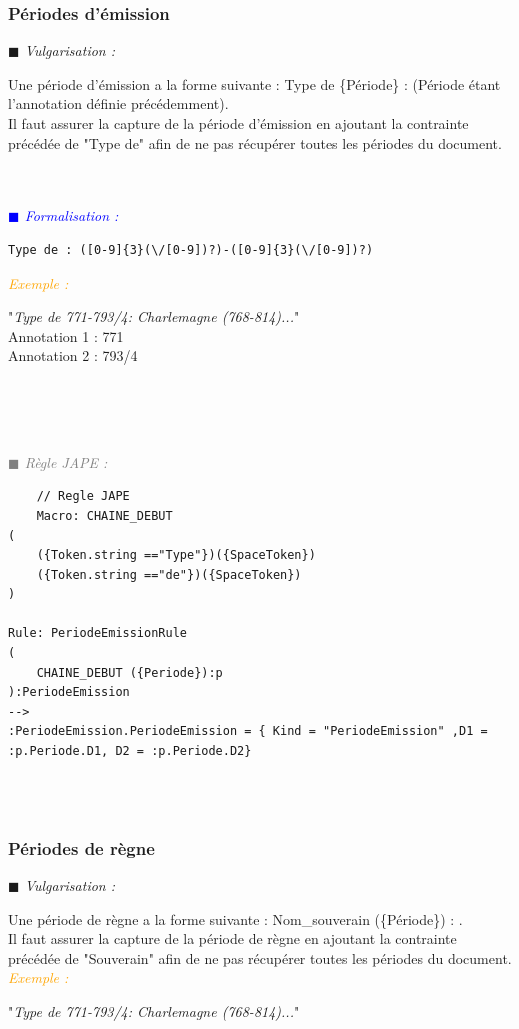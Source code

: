 \documentclass[a4paper, 11pt]{report}
\newenvironment{vulgarisation}
    {
    \textit{\textcolor{dark-blue}{$\blacksquare$  Vulgarisation : \\}}

    }
    {
    ~\\~\\
    }
\newenvironment{formalisation}
    {
    \textit{\textcolor{blue}{$\blacksquare$  Formalisation : \\}}
    }
    {
    ~\\~\\
    }
\newenvironment{codage}
    {
    \textit{\textcolor{gray}{$\blacksquare$  Règle JAPE : \\}}
    }
    {
    ~\\~\\
    }
\newenvironment{exemple}
    {
    \textit{\textcolor{orange}{
    Exemple : \\}}
    }
    {
    ~\\
    }
\begin{document}
\newpage
\subsubsection{Périodes d'émission}
\begin{vulgarisation}
    Une période d'émission a la forme suivante :  \og Type de \{Période\} : \fg{} (Période étant l'annotation définie précédemment).\\
    Il faut assurer la capture de la période d'émission en ajoutant la contrainte précédée de "Type de" afin de ne pas récupérer toutes les périodes du document.
\end{vulgarisation}
\begin{formalisation}
    \begin{verbatim}
Type de : ([0-9]{3}(\/[0-9])?)-([0-9]{3}(\/[0-9])?)
    \end{verbatim}
    \begin{exemple}
        "\emph{Type de 771-793/4: Charlemagne (768-814)...}" \\
        Annotation 1 : 771 \\
        Annotation 2 : 793/4
    \end{exemple}

\end{formalisation}
            \begin{codage}
    \begin{lstlisting}
    // Regle JAPE
    Macro: CHAINE_DEBUT
(
    ({Token.string =="Type"})({SpaceToken})
    ({Token.string =="de"})({SpaceToken})
)

Rule: PeriodeEmissionRule
(
    CHAINE_DEBUT ({Periode}):p
):PeriodeEmission
-->
:PeriodeEmission.PeriodeEmission = { Kind = "PeriodeEmission" ,D1 = :p.Periode.D1, D2 = :p.Periode.D2}
    \end{lstlisting}
    \end{codage}

\subsubsection{Périodes de règne}
\begin{vulgarisation}
    Une période de règne a la forme suivante : \og Nom\_souverain (\{Période\}) : \fg{}.\\
    Il faut assurer la capture de la période de règne en ajoutant la contrainte précédée de "Souverain" afin de ne pas récupérer toutes les périodes du document.\\
    \begin{exemple}
        "\emph{Type de 771-793/4: Charlemagne (768-814)...}" 
    \end{exemple}
\end{vulgarisation}
\end{document}
